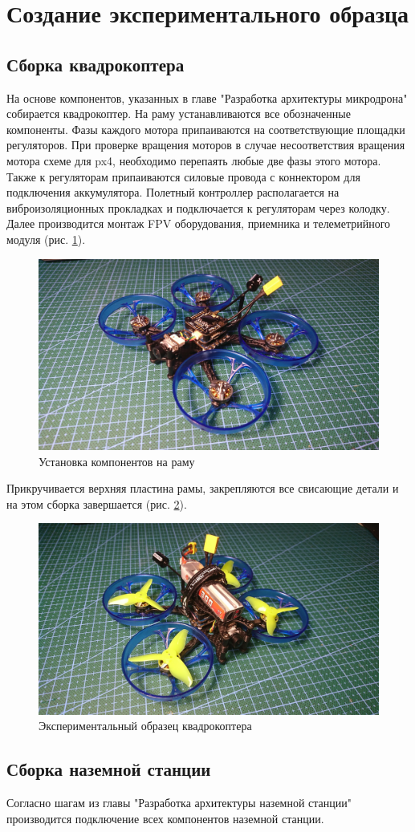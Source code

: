 
\section{Создание экспериментального образца}

\subsection{Сборка квадрокоптера}
На основе компонентов, указанных в главе "Разработка архитектуры микродрона" собирается квадрокоптер. На раму устанавливаются все обозначенные компоненты. Фазы каждого мотора припаиваются на соответствующие площадки регуляторов. При проверке вращения моторов в случае несоответствия вращения мотора схеме для px4, необходимо перепаять любые две фазы этого мотора. Также к регуляторам припаиваются силовые провода с коннектором для подключения аккумулятора. Полетный контроллер располагается на виброизоляционных прокладках и подключается к регуляторам через колодку. Далее производится монтаж FPV оборудования, приемника и телеметрийного модуля (рис. \ref{fig:quad1}).
\begin{figure}[H]
	\centering
	\includegraphics[width=0.5\linewidth]{pics/quad1}
	\caption{Установка компонентов на раму
	}
	\label{fig:quad1}
\end{figure}
Прикручивается верхняя пластина рамы, закрепляются все свисающие детали и на этом сборка завершается (рис. \ref{fig:quad2}).
\begin{figure}[H]
	\centering
	\includegraphics[width=0.5\linewidth]{pics/quad2}
	\caption{Экспериментальный образец квадрокоптера
	}
	\label{fig:quad2}
\end{figure}

\subsection{Сборка наземной станции}
Согласно шагам из главы "Разработка архитектуры наземной станции" про\-из\-водится подключение всех компонентов наземной станции.
